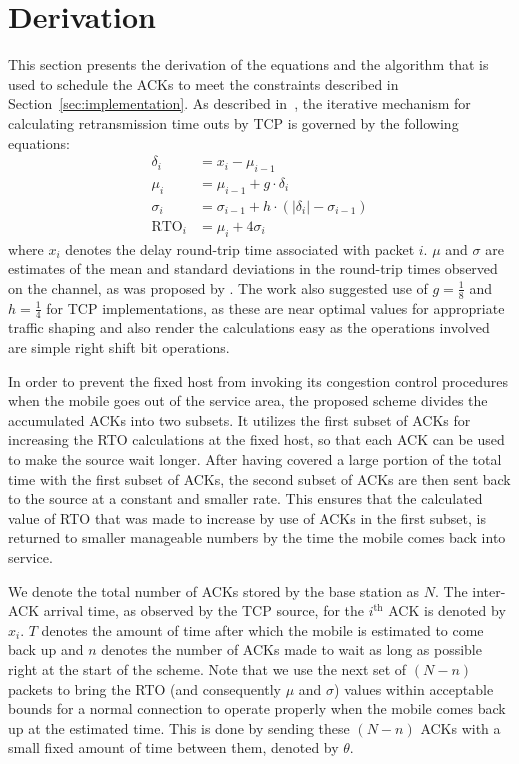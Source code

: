 \documentclass[conference]{IEEEtran}
\begin{document}
\section{Derivation}
\label{sec:derivation}
This section presents the derivation of the equations and the algorithm that is used to schedule the ACKs to meet the constraints described in Section~\ref{sec:implementation}. As described in~\cite{Stevens1994}, the iterative mechanism for calculating retransmission time outs by TCP is governed by the following equations:
\begin{align}
  \label{eq:rto-calculation-tcp-delta}
  \delta_i &= x_i - \mu_{i-1}\\
  \label{eq:rto-calculation-tcp-mu}
  \mu_i &= \mu_{i-1} + g \cdot \delta_i\\
  \label{eq:rto-calculation-tcp-sigma}
  \sigma_i &= \sigma_{i-1} + h \cdot \left(\left|\delta_i \right| - \sigma_{i-1}\right)\\
  \label{eq:rto-calculations-tcp-rto}
  \text{RTO}_i &= \mu_i + 4 \sigma_i
\end{align}
where $x_i$ denotes the delay round-trip time associated with packet $i$. $\mu$ and $\sigma$ are estimates of the mean and standard deviations in the round-trip times observed on the channel, as was proposed by \cite{Jacobson1988}. The work also suggested use of $g = \tfrac{1}{8}$ and $h = \tfrac{1}{4}$ for TCP implementations, as these are near optimal values for appropriate traffic shaping and also render the calculations easy as the operations involved are simple right shift bit operations. 
 
In order to prevent the fixed host from invoking its congestion control procedures when the mobile goes out of the service area, the proposed scheme divides the accumulated ACKs into two subsets. It utilizes the first subset of ACKs for increasing the RTO calculations at the fixed host, so that each ACK can be used to make the source wait longer. After having covered a large portion of the total time with the first subset of ACKs, the second subset of ACKs are then sent back to the source at a constant and smaller rate. This ensures that the calculated value of RTO that was made to increase by use of ACKs in the first subset, is returned to smaller manageable numbers by the time the mobile comes back into service.  

We denote the total number of ACKs stored by the base station as $N$. The inter-ACK arrival time, as observed by the TCP source, for the $i^\text{th}$ ACK is denoted by $x_i$. $T$ denotes the amount of time after which the mobile is estimated to come back up and $n$ denotes the number of ACKs made to wait as long as possible right at the start of the scheme. Note that we use the next set of $(N-n)$ packets to bring the RTO (and consequently $\mu$ and $\sigma$) values within acceptable bounds for a normal connection to operate properly when the mobile comes back up at the estimated time. This is done by sending these $(N-n)$ ACKs with a small fixed amount of time between them, denoted by $\theta$. 
\end{document}
